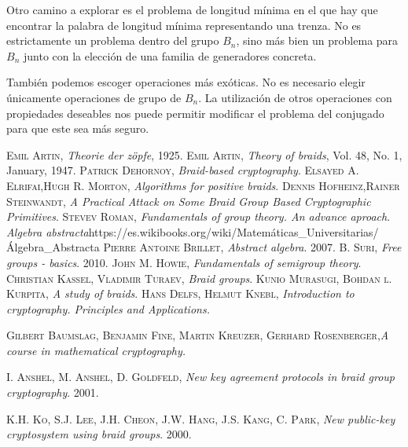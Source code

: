 \documentclass[12pt]{book}
\theoremstyle{definition}
\begin{document}
Otro camino a explorar es el problema de longitud mínima en el que hay que encontrar la palabra de longitud mínima representando una trenza. No es estrictamente un problema dentro del grupo $B_n$, sino más bien un problema para $B_n$ junto con la elección de una familia de generadores concreta.

También podemos escoger operaciones más exóticas. No es necesario elegir únicamente operaciones de grupo de $B_n$. La utilización de otros operaciones con propiedades deseables nos puede permitir modificar el problema del conjugado para que este sea más seguro.





\begin{thebibliography}{X}
\textsc{Emil Artin}, \textit{Theorie der z\"opfe}, 1925.
\textsc{Emil Artin}, \textit{Theory of braids}, Vol. 48, No. 1, January, 1947.
\textsc{Patrick Dehornoy}, \textit{Braid-based cryptography}.
\textsc{Elsayed A. Elrifai},\textsc{Hugh R. Morton}, \textit{Algorithms for positive braids}.
\textsc{Dennis Hofheinz},\textsc{Rainer Steinwandt}, \textit{A Practical Attack on Some Braid Group Based
Cryptographic Primitives}.
\textsc{Stevev Roman}, \textit{Fundamentals of group theory. An advance aproach}.
\textit{Algebra abstracta}\newline https://es.wikibooks.org/wiki/Matemáticas\_Universitarias/Álgebra\_Abstracta
\textsc{Pierre Antoine Brillet}, \textit{Abstract algebra}. 2007.
\textsc{B. Suri}, \textit{Free groups - basics}. 2010.
\textsc{John M. Howie}, \textit{Fundamentals of semigroup theory}.
\textsc{Christian Kassel}, \textsc{Vladimir Turaev}, \textit{Braid groups}.
\textsc{Kunio Murasugi}, \textsc{Bohdan l. Kurpita}, \textit{A study of braids}.
\textsc{Hans Delfs}, \textsc{Helmut Knebl}, \textit{Introduction to cryptography. Principles and Applications.}

\textsc{Gilbert Baumslag}, \textsc{Benjamin Fine},  \textsc{Martin Kreuzer}, \textsc{Gerhard Rosenberger},\textit{A course in mathematical cryptography.}

\textsc{I. Anshel}, \textsc{M. Anshel}, \textsc{D. Goldfeld}, \textit{New key agreement protocols in braid group cryptography}. 2001.


\textsc{K.H. Ko}, \textsc{S.J. Lee}, \textsc{J.H. Cheon}, \textsc{J.W. Hang}, \textsc{J.S. Kang}, \textsc{C. Park}, \textit{New public-key cryptosystem using braid groups}. 2000.


\end{thebibliography}
\end{document}
